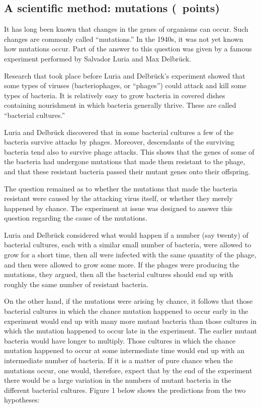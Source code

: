 \documentclass[12pt, addpoints]{exam}
\begin{document}
\subsection*{A scientific method: mutations (\numpoints\ points)}

It has long been known that changes in the genes of organisms can occur.
Such changes are commonly called “mutations.” In the 1940s, it was not
yet known how mutations occur. Part of the answer to this question was
given by a famous experiment performed by Salvador Luria and Max
Delbrück.

Research that took place before Luria and Delbrück's experiment 
showed that some types of viruses (bacteriophages, or “phages”) 
could attack and kill some types of bacteria. It is relatively easy to grow 
bacteria in covered dishes containing nourishment in which bacteria 
generally thrive. These are called “bacterial cultures.”

Luria and Delbrück discovered that in some bacterial cultures a few of
the bacteria survive attacks by phages. Moreover, descendants of the
surviving bacteria tend also to survive phage attacks. This shows that
the genes of some of the bacteria had undergone mutations that made them
resistant to the phage, and that these resistant bacteria passed their
mutant genes onto their offspring.

The question remained as to whether the mutations that made the bacteria
resistant were caused by the attacking virus itself, or whether they
merely happened by chance. The experiment at issue was designed to
answer this question regarding the cause of the mutations.

Luria and Delbrück considered what would happen if a number (say twenty)
of bacterial cultures, each with a similar small number of bacteria,
were allowed to grow for a short time, then all were infected with the
same quantity of the phage, and then were allowed to grow some more. If
the phages were producing the mutations, they argued, then all the
bacterial cultures should end up with roughly the same number of
resistant bacteria.

On the other hand, if the mutations were arising by chance, it follows
that those bacterial cultures in which the chance mutation happened to
occur early in the experiment would end up with many more mutant
bacteria than those cultures in which the mutation happened to occur
late in the experiment. The earlier mutant bacteria would have longer to
multiply. Those cultures in which the chance mutation happened to occur
at some intermediate time would end up with an intermediate number of
bacteria. If it is a matter of pure chance when the mutations occur, one
would, therefore, expect that by the end of the experiment there would
be a large variation in the numbers of mutant bacteria in the different
bacterial cultures. Figure 1 below shows the predictions from the two
hypotheses:
\end{document}
